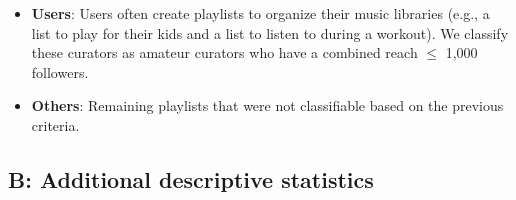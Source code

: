 \documentclass[12pt, a4paper, leqno]{article}
\begin{document}
\begin{itemize}
     \item \textbf{Users}: Users often create playlists to organize their music libraries (e.g., a list to play for their kids and a list to listen to during a workout). We classify these curators as amateur curators who have a combined reach $\leq$ 1,000 followers.
     
     \item \textbf{Others}: Remaining playlists that were not classifiable based on the previous criteria.
    
\end{itemize}

\subsection*{B: Additional descriptive statistics}
\label{summary_final_sample}

\setcounter{figure}{0}

\setcounter{table}{0}


\renewcommand\thefigure{B\arabic{figure}}
\renewcommand\thetable{B\arabic{table}}










    
\end{document}
